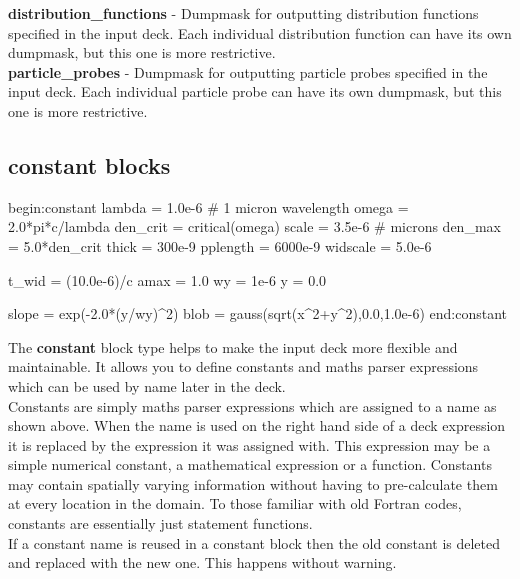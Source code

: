 \documentclass[12pt,a4paper]{article}
\newcommand{\emphtext}{\color{warwickdark} \fontfamily{phv}\selectfont\large\bf}
\newcommand{\inlineemph}[1]{{\color{warwicklight} \bf{#1}}}
\newenvironment{lboxverbatim}[1]{
\setlength{\FrameSep}{0pt}
\def\FrameCommand{\fboxsep=0pt \colorbox{shadecolor}}
\MakeFramed{\FrameRestore}
\vspace{-13.5pt}
\fvset{label=#1}
\boxverb
}{
\endboxverb
\vspace{-13.5pt}
\endMakeFramed
}
\begin{document}
{\emphtext distribution\_functions} - Dumpmask for outputting distribution
functions specified in the input deck. Each individual distribution function
can have its own dumpmask, but this one is more restrictive.\\

{\emphtext particle\_probes} - Dumpmask for outputting particle probes
specified in the input deck. Each individual particle probe
can have its own dumpmask, but this one is more restrictive.\\


\subsection{\inlineemph{constant} blocks}

\begin{lboxverbatim}{constant block}
begin:constant
   lambda = 1.0e-6 # 1 micron wavelength
   omega = 2.0*pi*c/lambda
   den_crit = critical(omega)
   scale = 3.5e-6 # microns
   den_max = 5.0*den_crit
   thick = 300e-9
   pplength = 6000e-9
   widscale = 5.0e-6

   t_wid = (10.0e-6)/c
   amax = 1.0
   wy = 1e-6
   y = 0.0

   slope = exp(-2.0*(y/wy)^2)
   blob = gauss(sqrt(x^2+y^2),0.0,1.0e-6)
end:constant
\end{lboxverbatim}

The \inlineemph{constant} block type helps to make the input deck more flexible
and maintainable. It allows you to define constants and maths parser
expressions which can be used by name later in the deck.\\

Constants are simply maths parser expressions which are assigned to a name as
shown above. When the name is used on the right hand side of a deck expression
it is replaced by the expression it was assigned with. This expression may
be a simple numerical constant, a mathematical expression or a function.
Constants may contain spatially varying information without having to
pre-calculate them at every location in the domain.
To those familiar with old Fortran codes, constants are essentially just
statement functions.\\

If a constant name is reused in a constant block then the old constant is
deleted and replaced with the new one. This happens without warning.\\
\end{document}
